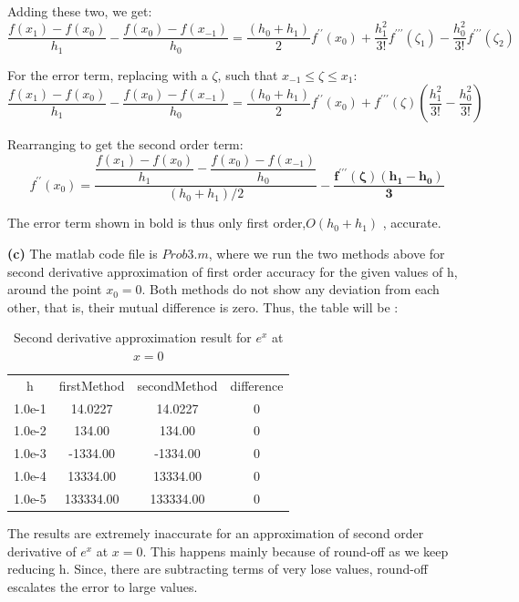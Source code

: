 \documentclass{article}
\renewcommand\part[1]{\vspace{.10in}\textbf{(#1)}}
\begin{document}
  Adding these two, we get:
  \[\dfrac{f(x_1) - f(x_0)}{h_1} - \dfrac{f(x_{0}) - f(x_{-1})}{h_0} = \dfrac{(h_0 + h_1)}{2}f^{\prime\prime}(x_0) + \dfrac{h_1^2}{3!}f^{\prime\prime\prime}(\zeta_1) - \dfrac{h_0^2}{3!}f^{\prime\prime\prime}(\zeta_2)\]

  For the error term, replacing with a $\zeta$, such that $x_{-1} \leq \zeta \leq x_1$:
  \[\dfrac{f(x_1) - f(x_0)}{h_1} - \dfrac{f(x_{0}) - f(x_{-1})}{h_0} = \dfrac{(h_0 + h_1)}{2}f^{\prime\prime}(x_0) + f^{\prime\prime\prime}(\zeta)(\dfrac{h_1^2}{3!} - \dfrac{h_0^2}{3!})\]

  Rearranging to get the second order term:
  \[f^{\prime\prime}(x_0) = \dfrac{\dfrac{f(x_1) - f(x_0)}{h_1} - \dfrac{f(x_{0}) - f(x_{-1})}{h_0}}{(h_0 + h_1)/2} - \mathbf{\dfrac{f^{\prime\prime\prime}(\zeta)(h_1 - h_0)}{3}}\]

  The error term shown in bold is thus only first order,$O(h_0 + h_1)$ , accurate.

  

  \part{c} The matlab code file is $Prob3.m$, where we run the two methods above for second derivative approximation of first order accuracy for the given values of h, around the point $x_0 = 0$. Both methods do not show any deviation from each other, that is, their mutual difference is zero.
  Thus, the table will be :
  \begin{longtable}{c|c|c|c}
	\caption{Second derivative approximation result for $e^x$ at $x=0$} \\
  \hline\hline
	  h & firstMethod & secondMethod & difference \\ [0.5ex]
	  1.0e-1 & 14.0227 &  14.0227 & 0 \\
	  1.0e-2 & 134.00 &   134.00 & 0 \\
	  1.0e-3 & -1334.00 & -1334.00 & 0 \\
	  1.0e-4 & 13334.00 & 13334.00 & 0 \\
	  1.0e-5 & 133334.00 & 133334.00 & 0  \\
  \hline

  \end{longtable}

	  The results are extremely inaccurate for an approximation of second order derivative of $e^x$ at $x=0$. This happens mainly because of round-off as we keep reducing h. Since, there are subtracting terms of very lose values, round-off  escalates the error to large values.
\end{document}

